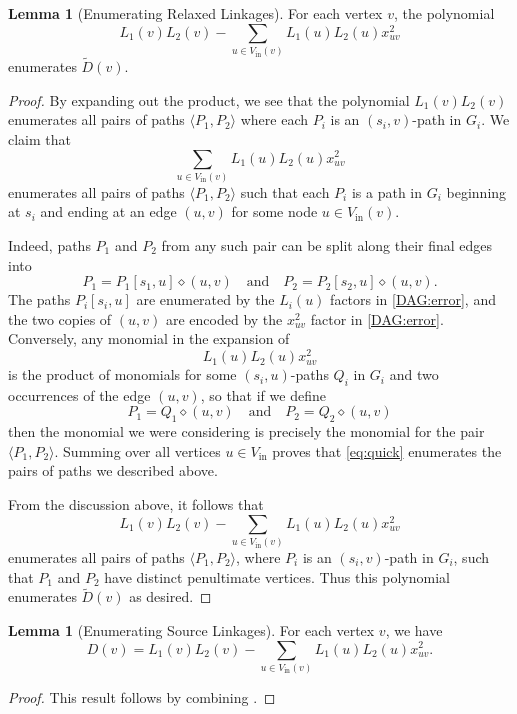 \documentclass[11pt]{article}
\newcommand{\dia}{\diamond}
\renewcommand{\t}{\text}
\newcommand{\vin}{V_{\t{in}}}
\theoremstyle{definition}
\newtheorem{lemma}[theorem]{Lemma}
\begin{document}
\begin{lemma}[Enumerating Relaxed Linkages]
\label{enum:relax-linkage}
    For each vertex $v$, the polynomial
            \[L_1(v)L_2(v) - \sum_{u\in \vin(v)} L_1(u)L_2(u)x_{uv}^2\]
        enumerates $\tilde{D}(v)$.
\end{lemma}
\begin{proof}
        By expanding out the product, we see that the polynomial  $L_1(v)L_2(v)$  enumerates all pairs of paths $\langle P_1,P_2\rangle$ where each $P_i$ is an $(s_i,v)$-path in $G_i$.
    We claim that 
    \begin{equation}
    \label{DAG:error}
    \sum_{u\in \vin(v)} L_1(u)L_2(u)x_{uv}^2
    \end{equation}
    enumerates all pairs of paths $\langle P_1,P_2\rangle$ such that each $P_i$ is a path in $G_i$ beginning at $s_i$ and ending at an edge $(u,v)$ for some node $u\in \vin(v)$.

    Indeed, paths $P_1$ and $P_2$ from any such pair can be split along their final edges into  
        \[P_1 = P_1[s_1,u]\dia (u,v) \quad\text{and}\quad
        P_2 = P_2[s_2,u] \dia (u,v).\]
    The paths $P_i[s_i,u]$ are enumerated by the $L_i(u)$ factors in \cref{DAG:error}, and the two copies of  $(u,v)$ are encoded by the $x_{uv}^2$ factor in \cref{DAG:error}.
    Conversely, any monomial in the expansion of
    \begin{equation}
        \label{eq:quick}
        L_1(u)L_2(u)x_{uv}^2
    \end{equation}
    is the product of monomials for some $(s_i,u)$-paths $Q_i$ in $G_i$ and two occurrences of the edge $(u,v)$, so that if we define
        \[P_1 = Q_1 \dia (u,v)\quad\text{and}\quad
        P_2 = Q_2 \dia (u,v)\]
    then the monomial we were considering is precisely the monomial for the pair $\langle P_1, P_2\rangle$.
    Summing over all vertices $u\in\vin$ proves that \cref{eq:quick} enumerates the pairs of paths we described above.

    From the discussion above, it follows that 
    \[
    L_1(v)L_2(v) - \sum_{u\in \vin(v)} L_1(u)L_2(u)x_{uv}^2
    \]
    enumerates all pairs of paths $\langle P_1,P_2\rangle$, where  $P_i$ is an $(s_i,v)$-path in $G_i$, such that $P_1$ and $P_2$ have distinct penultimate vertices.
    Thus this polynomial enumerates $\tilde{D}(v)$ as desired.
\end{proof}

\begin{lemma}[Enumerating Source Linkages]
\label{lem:DAG-left-disjoint}
    For each vertex $v$, we have 
\[
        D(v) = L_1(v)L_2(v) - \sum_{u\in \vin(v)} L_1(u)L_2(u)x_{uv}^2.
    \]
\end{lemma}
\begin{proof}
    This result follows by combining .
\end{proof}
\end{document}
